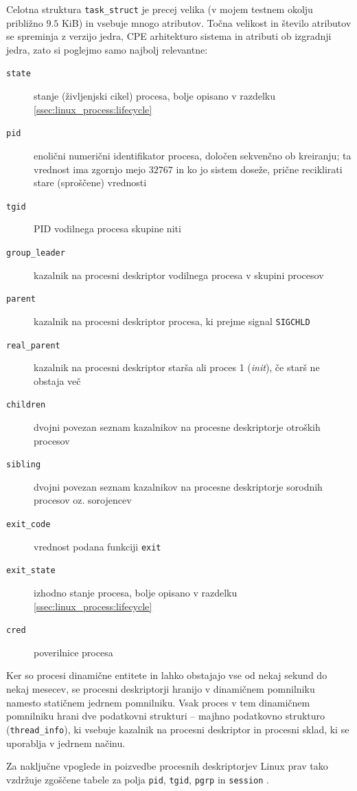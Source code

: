 \documentclass[a4paper,12pt,openright]{book}
\begin{document}
Celotna struktura \texttt{task\_struct} je precej velika (v mojem testnem okolju približno $9.5$ KiB) in vsebuje mnogo atributov.
Točna velikost in število atributov se spreminja z verzijo jedra, CPE arhitekturo sistema in atributi ob izgradnji jedra, zato si poglejmo samo najbolj relevantne:
\begin{description}
	\item[\texttt{state}] stanje (življenjski cikel) procesa, bolje opisano v razdelku \ref{ssec:linux_process:lifecycle}
	\item[\texttt{pid}] enolični numerični identifikator procesa, določen sekvenčno ob kreiranju; ta vrednost ima zgornjo mejo $32767$ in ko jo sistem doseže, prične reciklirati stare (sproščene) vrednosti
	\item[\texttt{tgid}] PID vodilnega procesa skupine niti
	\item[\texttt{group\_leader}] kazalnik na procesni deskriptor vodilnega procesa v skupini procesov
	\item[\texttt{parent}] kazalnik na procesni deskriptor procesa, ki prejme signal \texttt{SIGCHLD}
	\item[\texttt{real\_parent}] kazalnik na procesni deskriptor starša ali proces 1 (\textit{init}), če starš ne obstaja več
	\item[\texttt{children}] dvojni povezan seznam kazalnikov na procesne deskriptorje otroških procesov
	\item[\texttt{sibling}] dvojni povezan seznam kazalnikov na procesne deskriptorje sorodnih procesov oz. sorojencev
	\item[\texttt{exit\_code}] vrednost podana funkciji \texttt{exit}
	\item[\texttt{exit\_state}] izhodno stanje procesa, bolje opisano v razdelku \ref{ssec:linux_process:lifecycle}
	\item[\texttt{cred}] poverilnice procesa
\end{description}

Ker so procesi dinamične entitete in lahko obstajajo vse od nekaj sekund do nekaj mesecev, se procesni deskriptorji hranijo v dinamičnem pomnilniku namesto statičnem jedrnem pomnilniku.
Vsak proces v tem dinamičnem pomnilniku hrani dve podatkovni strukturi -- majhno podatkovno strukturo (\texttt{thread\_info}), ki vsebuje kazalnik na procesni deskriptor in procesni sklad, ki se uporablja v jedrnem načinu.

Za naključne vpoglede in poizvedbe procesnih deskriptorjev Linux prav tako vzdržuje zgoščene tabele za polja \texttt{pid}, \texttt{tgid}, \texttt{pgrp} in \texttt{session} \cite{Bovet_Cesati_2005}.
\end{document}
